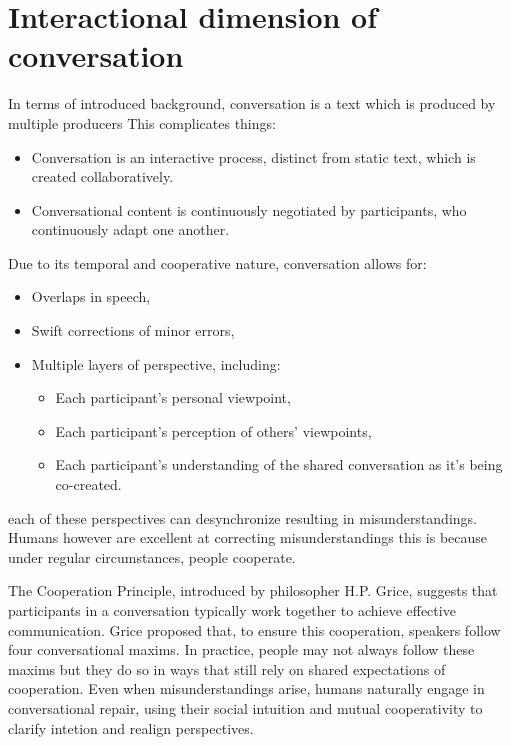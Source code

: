 \documentclass[12pt]{report}
\begin{document}
{\section{Interactional dimension of conversation}
\par
In terms of introduced background,
conversation is a text which is produced by multiple producers
This complicates things:

\begin{itemize}

    \item
    Conversation is an interactive process, distinct from static text, which is created collaboratively.

    \item
    Conversational content is continuously negotiated by participants, who continuously adapt one another.

\end{itemize}

Due to its temporal and cooperative nature, conversation allows for:
\begin{itemize}

    \item
    Overlaps in speech,

    \item
    Swift corrections of minor errors,

    \item
    Multiple layers of perspective, including:
        \begin{itemize}

            \item
            Each participant’s personal viewpoint,

            \item
            Each participant’s perception of others’ viewpoints,

            \item
            Each participant’s understanding of the shared conversation as it’s being co-created.
        \end{itemize}
\end{itemize}

        each of these perspectives can desynchronize resulting in misunderstandings.
        Humans however are excellent at correcting misunderstandings
        this is because under regular circumstances, people cooperate.

\par
The Cooperation Principle, introduced by philosopher H.P. Grice,
suggests that participants in a conversation typically work together to achieve effective communication.
Grice proposed that, to ensure this cooperation, speakers follow four conversational maxims.
In practice, people may not always follow these maxims
but they do so in ways that still rely on shared expectations of cooperation.
Even when misunderstandings arise,
humans naturally engage in conversational repair,
using their social intuition and mutual cooperativity to clarify intetion and realign perspectives.

}
\end{document}
